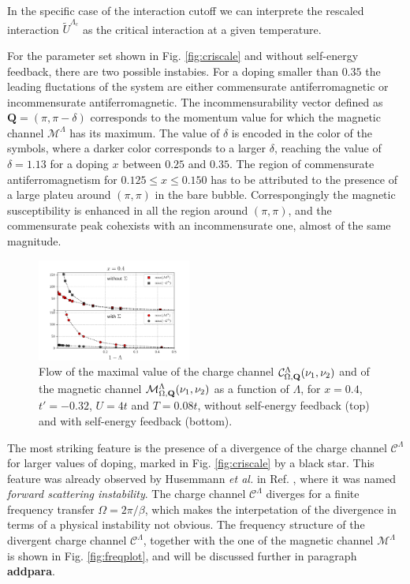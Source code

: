 In the specific case of the interaction cutoff we can interprete the rescaled interaction $\tilde U^{\Lambda_\mathrm{c}}$ as the critical interaction at a given temperature.

For the parameter set shown in Fig. \ref{fig:criscale} and without self-energy feedback, there are two possible instabies. 
For a doping smaller than $0.35$ the leading fluctations of the system are either commensurate antiferromagnetic or incommensurate antiferromagnetic. 
The incommensurability vector defined as $\mathbf{Q}=(\pi,\pi-\delta)$ corresponds to the momentum value for which the magnetic channel $\mathcal{M}^\Lambda$ has its maximum. The value of $\delta$ is encoded in the color of the symbols, where a darker color corresponds to a larger $\delta$, reaching the value of $\delta=1.13$ for a doping $x$ between $0.25$ and $0.35$. 
The region of commensurate antiferromagnetism for  $0.125\le x \le 0.150$ has to be attributed to the presence of a large plateu around $(\pi,\pi)$ in the bare bubble. Correspongingly the magnetic susceptibility is enhanced in all the region around $(\pi,\pi)$, and the commensurate peak cohexists with an incommensurate one, almost of the same magnitude.   
\begin{figure}
\includegraphics[width=0.45\textwidth]{images/chargeproblem_MC_vs_Lambda_fix_occ.png}
\caption{Flow of the maximal value of the charge channel $\mathcal{C}^\Lambda_{\Omega,\mathbf{Q}}(\nu_1,\nu_2)$ and of the magnetic channel $\mathcal{M}^\Lambda_{\Omega,\mathbf{Q}}(\nu_1,\nu_2)$ as a function of $\Lambda$, for  $x=0.4$, $t'=-0.32$, $U=4t$ and $T=0.08t$, without self-energy feedback (top) and with self-energy feedback (bottom). }
\label{fig:chargeproblem}
\end{figure}

The most striking feature is the presence of a divergence of the charge channel $\mathcal{C}^\Lambda$ for larger values of doping, marked in Fig. \ref{fig:criscale} by a black star. 
This feature was already observed by Husemmann \textit{et al.} in Ref. , where it was named \textit{forward scattering instability}. 
The charge channel $\mathcal{C}^\Lambda$ diverges for a finite frequency transfer $\Omega=2\pi/\beta$, which makes the interpetation of the divergence in terms of a physical instability not obvious. 
The frequency structure of the divergent charge channel $\mathcal{C}^\Lambda$, together with the one of the magnetic channel $\mathcal{M}^\Lambda$ is shown in Fig. \ref{fig:freqplot}, and will be discussed further in paragraph \textbf{addpara}.


